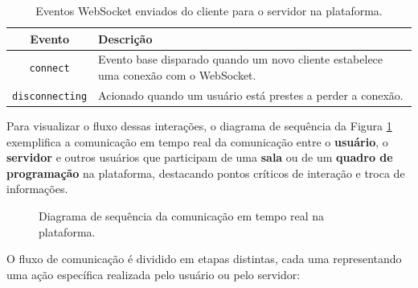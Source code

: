 \begin{table}[H]
    \centering
    \caption{Eventos WebSocket enviados do cliente para o servidor na plataforma.}
    \label{tab:websocket-server-control-events}
    \renewcommand{\arraystretch}{1.3} 
    \begin{tabular}{|c|p{10cm}|}
        \hline
        \textbf{Evento} & \textbf{Descrição} \\
        \hline
        \texttt{connect} & Evento base disparado quando um novo cliente estabelece uma conexão com o WebSocket. \\
        \hline
        \texttt{disconnecting} & Acionado quando um usuário está prestes a perder a conexão. \\
        \hline
    \end{tabular}
\end{table}


Para visualizar o fluxo dessas interações, o diagrama de sequência da Figura \ref{fig:websocket-flow} exemplifica a comunicação em tempo real da comunicação entre o \textbf{usuário}, o \textbf{servidor} e outros usuários que participam de uma \textbf{sala} ou de um \textbf{quadro de programação} na plataforma, destacando pontos críticos de interação e troca de informações.

\begin{figure}[H]
    \centering
    \caption{Diagrama de sequência da comunicação em tempo real na plataforma.}
    \label{fig:websocket-flow}
\end{figure}

 O fluxo de comunicação é dividido em etapas distintas, cada uma representando uma ação específica realizada pelo usuário ou pelo servidor:

